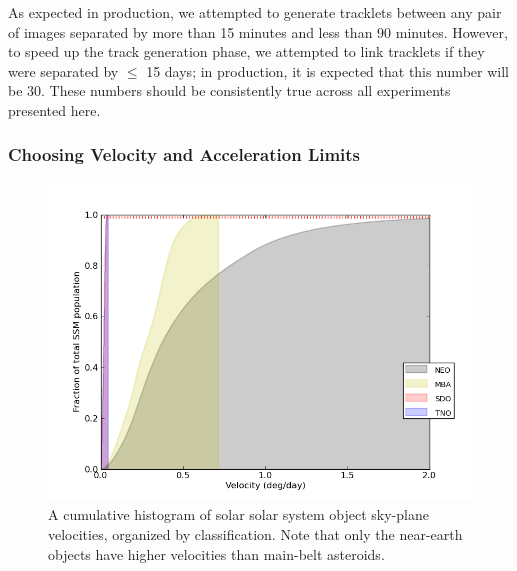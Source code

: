 As expected in production, we attempted to generate tracklets between
any pair of images separated by more than 15 minutes and less than
90 minutes.  However, to speed up the track generation phase, we
attempted to link tracklets if they were separated by $\leq$ 15 days;
in production, it is expected that this number will be 30.  These
numbers should be consistently true across all experiments presented
here.


\subsubsection{Choosing Velocity and Acceleration Limits}
\label{velAccLimits}
\begin{figure}[ht!]
  \centering
  \includegraphics[width=13cm]{illustrations/mopsplots/aug2011/n_velocity.png}
  \caption{A cumulative histogram of solar solar system object
    sky-plane velocities, organized by classification.  Note that only
    the near-earth objects have higher velocities than main-belt
    asteroids.}
  \label{velSurvey}
\end{figure}

